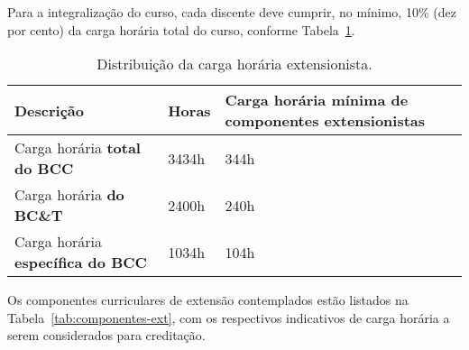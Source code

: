 Para a integralização do curso, cada discente deve cumprir, no mínimo,
10\% (dez por cento) da carga horária total do curso, conforme Tabela~\ref{tab:carga-ext}.

\begin{table}[h!]
  \caption{Distribuição da carga horária extensionista.}
  \label{tab:carga-ext}\centering
  \begin{tabular}{|p{}|p{}|p{}|}\hline
    Descrição & Horas & Carga horária mínima de componentes extensionistas\\\hline
    Carga horária \textbf{total do BCC} & 3434h & 344h\\\hline
    Carga horária \textbf{do BC\&T} & 2400h & 240h \\\hline
    Carga horária \textbf{específica do BCC} & 1034h & 104h \\\hline
  \end{tabular}
\end{table}

Os componentes curriculares de extensão contemplados estão listados na
Tabela~\ref{tab:componentes-ext}, com os respectivos indicativos de carga horária a
serem considerados para creditação.

